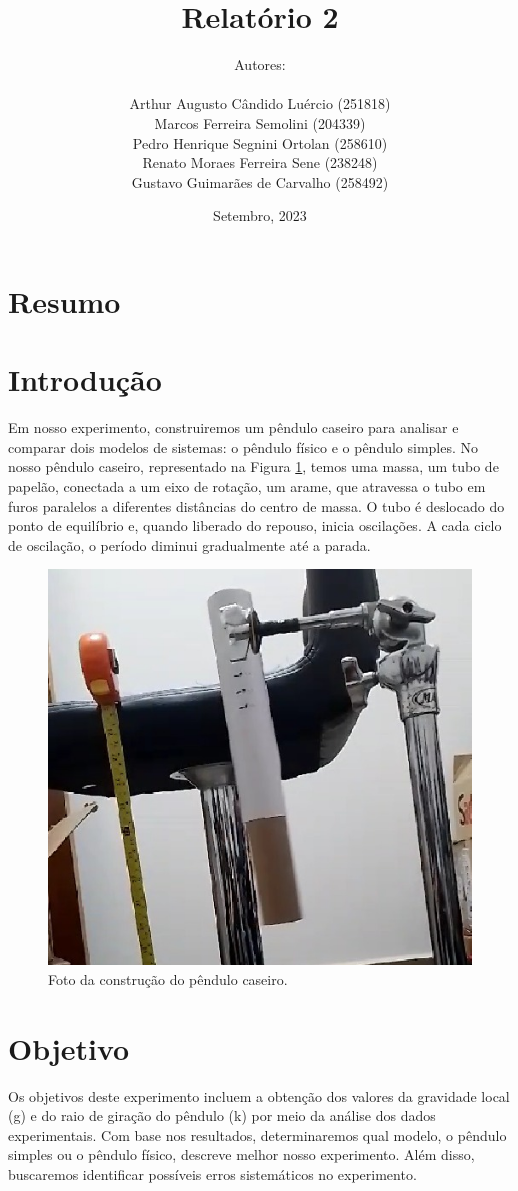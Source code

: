 \documentclass[hidelinks,a4paper,12pt]{article}
\title{\huge
{\textbf{Relatório 2}}
 \\
\fontsize{30pt}{36pt}\selectfont{\textbf{O Pêndulo Físico}}
}
\author{
Autores:\\ \ \\
Arthur Augusto Cândido Luércio (251818) \\
Marcos Ferreira Semolini (204339) \\
Pedro Henrique Segnini Ortolan (258610) \\
Renato Moraes Ferreira Sene (238248) \\
Gustavo Guimarães de Carvalho (258492)
}
\date{Setembro, 2023}
\begin{document}
\pagestyle{fancy}
\fancyfoot{}\fancyhead{}
\maketitle{}
\pagebreak
{}
\fancyfoot[R]{\thepage}
\section*{Resumo}

\section*{Introdução}

    \qquad Em nosso experimento, construiremos um pêndulo caseiro para analisar e comparar dois modelos de sistemas: o pêndulo físico e o pêndulo simples.
    No nosso pêndulo caseiro, representado na Figura \ref{fig:1.1}, temos uma massa, um tubo de papelão, conectada a um eixo de rotação, um arame, que atravessa o tubo em furos paralelos a diferentes distâncias do centro de massa. O tubo é deslocado do ponto de equilíbrio e, quando liberado do repouso, inicia oscilações. A cada ciclo de oscilação, o período diminui gradualmente até a parada.

    \begin{figure}[h]
        \centering
        \includegraphics[width=0.4\linewidth]{pendulo caseiro.png}
        \caption{\small{Foto da construção do pêndulo caseiro.}}
        \label{fig:1.1}
    \end{figure}

\section*{Objetivo}

    \qquad Os objetivos deste experimento incluem a obtenção dos valores da gravidade local (g) e do raio de giração do pêndulo (k) por meio da análise dos dados experimentais. Com base nos resultados, determinaremos qual modelo, o pêndulo simples ou o pêndulo físico, descreve melhor nosso experimento. Além disso, buscaremos identificar possíveis erros sistemáticos no experimento.
    
\end{document}
